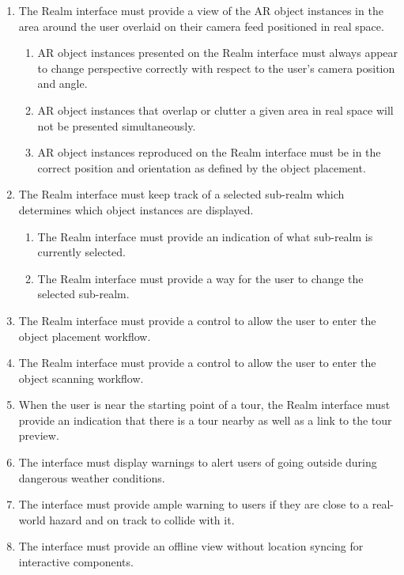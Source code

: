 \documentclass{article}
\begin{document}
\begin{enumerate}[align=left, label=\textbf{RI-FR\arabic*:}]
    \item The Realm interface must provide a view of the AR object instances in the area around the user overlaid on their camera feed positioned in real space.
          \begin{enumerate}[align=left, label=\textbf{RI-FR1.\arabic*:}]
              \item AR object instances presented on the Realm interface must always appear to change perspective correctly with respect to the user’s camera position and angle.
              \item AR object instances that overlap or clutter a given area in real space will not be presented simultaneously.
              \item AR object instances reproduced on the Realm interface must be in the correct position and orientation as defined by the object placement.
          \end{enumerate}

    \item The Realm interface must keep track of a selected sub-realm which determines which object instances are displayed.
          \begin{enumerate}[align=left, label=\textbf{RI-FR2.\arabic*:}]
              \item The Realm interface must provide an indication of what sub-realm is currently selected.
              \item The Realm interface must provide a way for the user to change the selected sub-realm.
          \end{enumerate}

    \item The Realm interface must provide a control to allow the user to enter the object placement workflow.
    \item The Realm interface must provide a control to allow the user to enter the object scanning workflow.
    \item When the user is near the starting point of a tour, the Realm interface must provide an indication that there is a tour nearby as well as a link to the tour preview.
    \item The interface must display warnings to alert users of going outside during dangerous weather conditions. \\
    \item The interface must provide ample warning to users if they are close to a real-world hazard and on track to collide with it. \\
    \item The interface must provide an offline view without location syncing for interactive components. \\
\end{enumerate}
\end{document}
